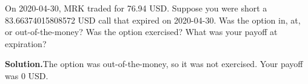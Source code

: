 \noindent On 2020-04-30, MRK traded for 76.94 USD. Suppose you were short a 83.66374015808572 USD call that expired on 2020-04-30. Was the option in, at, or out-of-the-money? Was the option exercised? What was your payoff at expiration?

\vspace{9pt} 

\textbf{Solution.}The option was out-of-the-money, so it was not exercised. Your payoff was 0 USD.